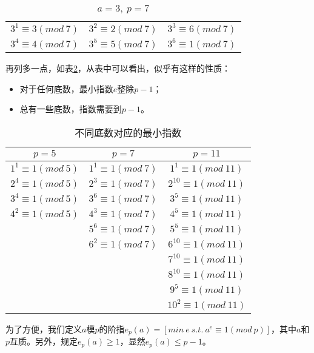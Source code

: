 \begin{table}[!htbp]
	\centering
	\caption{$a=3,\ p=7$ \label{tab:root}}
	\begin{tabular}{ccc}
		\midrule
		 $3^1\equiv 3(mod\ 7)$  & $3^2\equiv 2(mod\ 7)$ & $3^3\equiv 6(mod\ 7)$ \\
		 $3^4\equiv 4(mod\ 7)$    & $3^5\equiv 5(mod\ 7)$ & $3^6\equiv 1(mod\ 7)$ \\
		 \bottomrule
	\end{tabular}%
\end{table}%

再列多一点，如表\ref{tab:root2}，从表中可以看出，似乎有这样的性质：
\begin{itemize}
	\item 对于任何底数，最小指数$e$整除$p-1$；
	\item 总有一些底数，指数需要到$p-1$。
\end{itemize}

\begin{table}[!htbp]
	\centering
	\caption{不同底数对应的最小指数 \label{tab:root2}}
	\begin{tabular}{ccc}
		\toprule
		$p=5$  & $p=7$ & $p=11$ \\
		\midrule
		$1^1\equiv 1(mod\ 5)$  & $1^1\equiv 1(mod\ 7)$ & $1^1\equiv 1(mod\ 11)$ \\
		$2^4\equiv 1(mod\ 5)$    & $2^3\equiv 1(mod\ 7)$ & $2^{10}\equiv 1(mod\ 11)$ \\
		$3^4\equiv 1(mod\ 5)$  & $3^6\equiv 1(mod\ 7)$ & $3^5\equiv 1(mod\ 11)$ \\
		$4^2\equiv 1(mod\ 5)$    & $4^3\equiv 1(mod\ 7)$ & $4^5\equiv 1(mod\ 11)$ \\
	                             & $5^6\equiv 1(mod\ 7)$ & $5^5\equiv 1(mod\ 11)$ \\
		    					& $6^2\equiv 1(mod\ 7)$ & $6^{10}\equiv 1(mod\ 11)$ \\
		  											& & $7^{10}\equiv 1(mod\ 11)$ \\
		   			  								& & $8^{10}\equiv 1(mod\ 11)$ \\
		   			  								& & $9^{5}\equiv 1(mod\ 11)$ \\
		   			  								& & $10^{2}\equiv 1(mod\ 11)$ \\
		\bottomrule
	\end{tabular}%
\end{table}%


为了方便，我们定义$a$模$p$的阶指$e_p(a)=[min\ e\ s.t.\ a^e\equiv 1(mod \ p)]$，其中$a$和$p$互质。另外，规定$e_p(a)\ge 1$，显然$e_p(a)\le p-1$。

